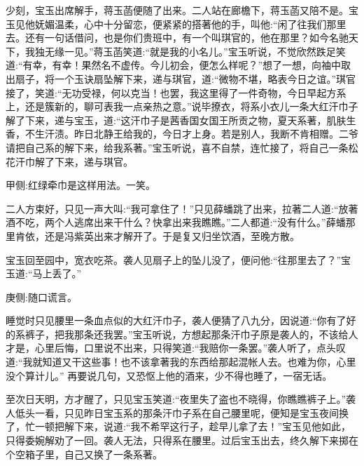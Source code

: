 \begin{parag}
    少刻，宝玉出席解手，蒋玉菡便随了出来。二人站在廊檐下，蒋玉菡又陪不是。宝玉见他妩媚温柔，心中十分留恋，便紧紧的搭著他的手，叫他:“闲了往我们那里去。还有一句话借问，也是你们贵班中，有一个叫琪官的，他在那里？如今名驰天下，我独无缘一见。”蒋玉菡笑道:“就是我的小名儿。”宝玉听说，不觉欣然跌足笑道:“有幸，有幸！果然名不虚传。今儿初会，便怎么样呢？”想了一想，向袖中取出扇子，将一个玉诀扇坠解下来，递与琪官，道:“微物不堪，略表今日之谊。”琪官接了，笑道:“无功受禄，何以克当！也罢，我这里得了一件奇物，今日早起方系上，还是簇新的，聊可表我一点亲热之意。”说毕撩衣，将系小衣儿一条大红汗巾子解了下来，递与宝玉，道:“这汗巾子是茜香国女国王所贡之物，夏天系著，肌肤生香，不生汗渍。昨日北静王给我的，今日才上身。若是别人，我断不肯相赠。二爷请把自己系的解下来，给我系著。”宝玉听说，喜不自禁，连忙接了，将自己一条松花汗巾解了下来，递与琪官。\begin{note}甲侧:红绿牵巾是这样用法。一笑。\end{note}二人方束好，只见一声大叫:“我可拿住了！”只见薛蟠跳了出来，拉著二人道:“放著酒不吃，两个人逃席出来干什么？快拿出来我瞧瞧。”二人都道:“没有什么。”薛蟠那里肯依，还是冯紫英出来才解开了。于是复又归坐饮酒，至晚方散。
\end{parag}


\begin{parag}
    宝玉回至园中，宽衣吃茶。袭人见扇子上的坠儿没了，便问他:“往那里去了？”宝玉道:“马上丢了。”\begin{note}庚侧:随口谎言。\end{note}睡觉时只见腰里一条血点似的大红汗巾子，袭人便猜了八九分，因说道:“你有了好的系裤子，把我那条还我罢。”宝玉听说，方想起那条汗巾子原是袭人的，不该给人才是，心里后悔，口里说不出来，只得笑道:“我赔你一条罢。”袭人听了，点头叹道:“我就知道又干这些事！也不该拿著我的东西给那起混帐人去。也难为你，心里没个算计儿。” 再要说几句，又恐怄上他的酒来，少不得也睡了，一宿无话。
\end{parag}


\begin{parag}
    至次日天明，方才醒了，只见宝玉笑道:“夜里失了盗也不晓得，你瞧瞧裤子上。”袭人低头一看，只见昨日宝玉系的那条汗巾子系在自己腰里呢，便知是宝玉夜间换了，忙一顿把解下来，说道:“我不希罕这行子，趁早儿拿了去！”宝玉见他如此，只得委婉解劝了一回。袭人无法，只得系在腰里。过后宝玉出去，终久解下来掷在个空箱子里，自己又换了一条系著。
\end{parag}


